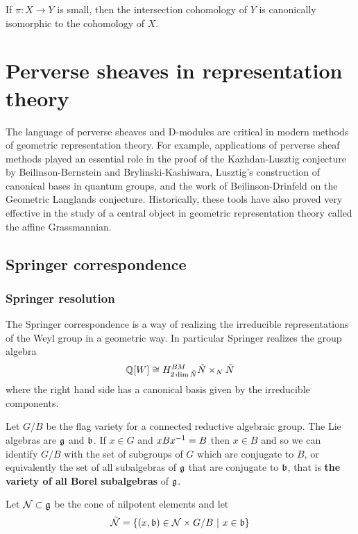 \documentclass[12pt]{article}
\begin{document}
\begin{proposition}
    If $\pi:X\to Y$ is small, then the intersection
    cohomology of $Y$ is canonically isomorphic to the
    cohomology of $X$.
\end{proposition}

\section{Perverse sheaves in representation theory}
The language of perverse sheaves and D-modules are critical in modern methods of geometric representation theory. For example, applications of perverse sheaf methods played an essential role in the proof of the Kazhdan-Lusztig conjecture by Beilinson-Bernstein and Brylinski-Kashiwara, Lusztig’s construction of canonical bases in quantum groups, and the work of Beilinson-Drinfeld on the Geometric Langlands conjecture. Historically, these tools have also proved very effective in the study of a central object in geometric representation theory called the affine Grassmannian.

\subsection{Springer correspondence}
\subsubsection{Springer resolution}
The Springer correspondence is a way of realizing
the irreducible representations of the Weyl group in a geometric way. In particular
Springer realizes the group algebra \begin{align*}
    \mathbb{Q}[W] \cong H^{BM}_{2\dim \tilde N}{\tilde N\times_N \tilde N}
\end{align*} where the right hand side
has a canonical basis given by the irreducible components.

Let $G/B$ be the flag variety for a connected reductive algebraic group.
The Lie algebras are $\mathfrak{g}$ and $\mathfrak{b}$. If $x\in G$ and $xB{x}^{-1} = B$
then $x\in B$ and so we can identify $G/B$ with the set of subgroups of $G$
which are conjugate to $B$, or equivalently the set of all subalgebras of $\mathfrak{g}$
that are conjugate to $\mathfrak{b}$, that is \textbf{the variety of all Borel subalgebras} of $\mathfrak{g}$.

Let ${\mathcal{N}}\subset \mathfrak{g}$ be
the cone of nilpotent elements and let \begin{align*}
    \tilde {{\mathcal{N}}} = \{(x,\mathfrak{b})\in {\mathcal{N}}\times G/B \ \vert \  x\in \mathfrak{b}\}
\end{align*}
\end{document}
